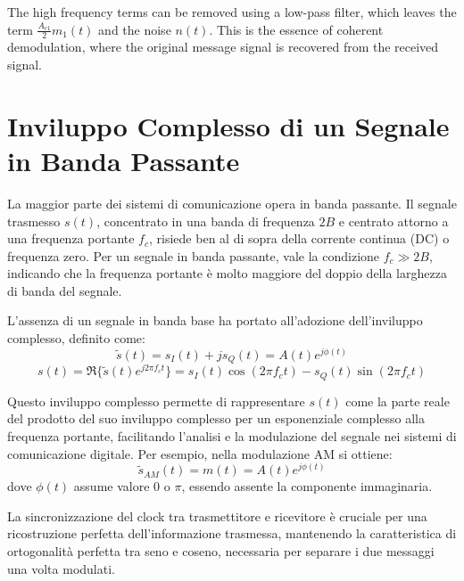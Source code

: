 The high frequency terms can be removed using a low-pass filter, which leaves the term \( \frac{A_{c1}}{2} m_1(t) \) and the noise \( n(t) \). This is the essence of coherent demodulation, where the original message signal is recovered from the received signal.


\section*{Inviluppo Complesso di un Segnale in Banda Passante}

La maggior parte dei sistemi di comunicazione opera in banda passante. Il segnale trasmesso \( s(t) \), concentrato in una banda di frequenza \( 2B \) e centrato attorno a una frequenza portante \( f_c \), risiede ben al di sopra della corrente continua (DC) o frequenza zero. Per un segnale in banda passante, vale la condizione \( f_c \gg 2B \), indicando che la frequenza portante è molto maggiore del doppio della larghezza di banda del segnale.

L'assenza di un segnale in banda base ha portato all'adozione dell'inviluppo complesso, definito come:
\begin{equation}
    \tilde{s}(t) = s_I(t) + js_Q(t) = A(t)e^{j\phi(t)}
\end{equation}
\begin{equation}
    s(t) = \Re\{\tilde{s}(t)e^{j2\pi f_c t}\} = s_I(t)\cos(2\pi f_c t) - s_Q(t)\sin(2\pi f_c t)
\end{equation}

Questo inviluppo complesso permette di rappresentare \( s(t) \) come la parte reale del prodotto del suo inviluppo complesso per un esponenziale complesso alla frequenza portante, facilitando l'analisi e la modulazione del segnale nei sistemi di comunicazione digitale. Per esempio, nella modulazione AM si ottiene:
\begin{equation}
    \tilde{s}_{AM}(t) = m(t) = A(t)e^{j\phi(t)}
\end{equation}
dove \( \phi(t) \) assume valore \( 0 \) o \( \pi \), essendo assente la componente immaginaria.

La sincronizzazione del clock tra trasmettitore e ricevitore è cruciale per una ricostruzione perfetta dell'informazione trasmessa, mantenendo la caratteristica di ortogonalità perfetta tra seno e coseno, necessaria per separare i due messaggi una volta modulati.

